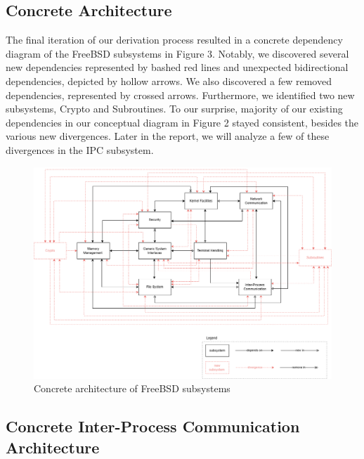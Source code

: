 \documentclass[12pt, dvipsnames, a4paper]{article}
\begin{document}
\subsection{Concrete Architecture}

The final iteration of our derivation process resulted in a concrete dependency diagram of the FreeBSD subsystems in Figure 3. Notably, we discovered several new dependencies represented by bashed red lines and unexpected bidirectional dependencies, depicted by hollow arrows. We also discovered a few removed dependencies, represented by crossed arrows. Furthermore, we identified two new subsystems, Crypto and Subroutines. To our surprise, majority of our existing dependencies in our conceptual diagram in Figure 2 stayed consistent, besides the various new divergences. Later in the report, we will analyze a few of these divergences in the IPC subsystem.

\begin{figure}[!htb]
	\center
	\includegraphics[width = 390pt]{assets/concrete-architecture.png}
	\caption{Concrete architecture of FreeBSD subsystems}
\end{figure}
\clearpage
\subsection{Concrete Inter-Process Communication Architecture}
\end{document}
